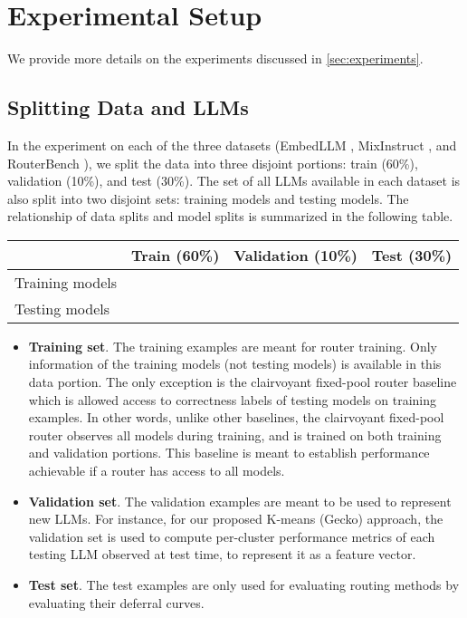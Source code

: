 

\section{Experimental Setup}

We provide more details on the experiments discussed in \cref{sec:experiments}.

\subsection{Splitting Data and LLMs}

In the experiment on each of the three datasets (EmbedLLM \citep{ZhuWuWen2024}, MixInstruct \citep{Jiang:2023},  and RouterBench \citep{HuBieLi2024}), we split the data into three disjoint portions:  train (60\%), validation (10\%), and test (30\%). 
The set of all LLMs available in each dataset is also split into two disjoint sets: training models and testing models. The relationship of data splits and model splits is summarized in the following table.


\newcommand{\cmark}{\ding{51}}%
\newcommand{\xmark}{\ding{55}}%
\newcommand{\shadecell}{ \cellcolor{gray!25}}
\begin{center}
\begin{tabular}{l|>{\centering\arraybackslash}p{49mm}|>{\centering\arraybackslash}p{14mm}|>{\centering\arraybackslash}p{28mm}}
\toprule
    & Train (60\%) & Validation (10\%) & Test (30\%) \\
\midrule 
  Training models & \shadecell \cmark & \shadecell \cmark & \xmark \\
  Testing models & \xmark    & \shadecell \cmark & \shadecell \cmark \\ 
\bottomrule
\end{tabular}
\end{center}

\begin{itemize}
    \item \textbf{Training set}. The training examples are meant for router training. Only information of the training models (not testing models) is available in this data portion.  The only exception is the clairvoyant fixed-pool router baseline which is allowed access to correctness labels of testing models  on training examples. In other words, unlike other baselines, the clairvoyant fixed-pool router observes all models during training, and is trained on both training and validation portions. This baseline is meant to establish performance achievable if a router has access to all models.
    \item \textbf{Validation set}. The validation examples are meant to be used to represent new LLMs. For instance, for our proposed K-means (Gecko) approach, the validation set is used to compute per-cluster performance metrics of each testing LLM observed at test time, to represent it as a feature vector.
    \item \textbf{Test set}. The test examples are only used for evaluating routing methods by evaluating their deferral curves.
\end{itemize}

